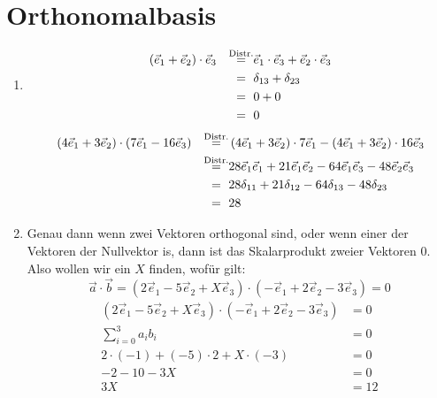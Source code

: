 \documentclass[sectionformat = aufgabe]{gadsescript}
\begin{document}
\maketitle

\section{Orthonomalbasis}
\begin{enumerate}[label=\alph*)]
	\item 
		\begin{alignat*}{3}
			&\left( \vec e_1 + \vec e_2 \right) \cdot \vec e_3
				&\omit\hfil$\overset{\text{Distr.}}{=}$\hfil&\vec e_1 \cdot \vec e_3 + \vec e_2 \cdot \vec e_3\\
			&~&\omit\hfil$=$\hfil&\delta_{13} + \delta_{23}\\
			&~&\omit\hfil$=$\hfil& 0 + 0\\
			&~&\omit\hfil$=$\hfil&0
		\end{alignat*}
		\begin{alignat*}{3}
			&\left(4\vec e_1 + 3 \vec e_2 \right) \cdot \left(7\vec e_1 - 16\vec e_3\right)
				&\omit\hfil$\overset{\text{Distr.}}{=}$\hfil&\left( 4\vec e_1 + 3\vec e_2 \right) \cdot 7\vec e_1 - \left( 4\vec e_1 + 3\vec e_2 \right) \cdot 16\vec e_3\\
			&~&\omit\hfil$\overset{\text{Distr.}}{=}$\hfil&28\vec e_1\vec e_1 + 21\vec e_1 \vec e_2 - 64\vec e_1\vec e_3 - 48\vec e_2 \vec e_3\\
			&~&\omit\hfil$=$\hfil&28\delta_{11} + 21\delta_{12} - 64\delta_{13} - 48\delta_{23}\\
			&~&\omit\hfil$=$\hfil&28
		\end{alignat*}
	\item Genau dann wenn zwei Vektoren orthogonal sind, oder wenn einer der Vektoren der Nullvektor is, dann ist das Skalarprodukt zweier Vektoren 0. Also wollen wir ein $X$ finden, wofür gilt:
		\[ \vec a \cdot \vec b = \left(2\vec e_1 - 5\vec e_2 + X\vec e_3 \right) \cdot \left( -\vec e_1 + 2\vec e_2 - 3\vec e_3 \right) = 0 \]
		\begin{align*}
			\left(2\vec e_1 - 5\vec e_2 + X\vec e_3 \right) \cdot \left( -\vec e_1 + 2\vec e_2 - 3\vec e_3 \right) &= 0\\
			\sum_{i = 0}^{3}a_ib_i &= 0\\
			2\cdot(-1) + (-5)\cdot2 + X\cdot(-3) &= 0\\
			-2 -10 -3X &= 0\\
			3X &= 12\\

\end{align*}
\end{enumerate}
\end{document}
